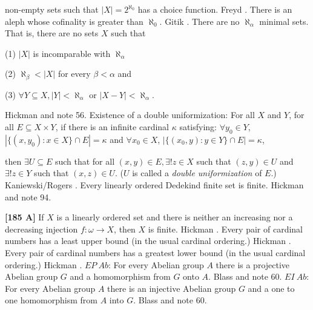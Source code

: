 non-empty sets such that $|X|=2^{\aleph_0}$ has a choice function.
\ac{Freyd} \cite{1980}.
\medskip
{} There is an aleph whose cofinality is greater
than $\aleph_{0}$.  \ac{Gitik} \cite{1980}.
\medskip
{}  There are no $\aleph_{\alpha}$
minimal  sets.  That is, there are no sets $X$ such that
\item\item{}{(1)} $|X|$ is incomparable with $\aleph_{\alpha}$
\item\item{}{(2)} $\aleph_{\beta}<|X|$ for every $\beta < \alpha $ and
\item\item{}{(3)} $\forall Y\subseteq X, |Y|<\aleph_{\alpha}$ or $|X-Y|
<\aleph_{\alpha}$.
\item{} \ac{Hickman} \cite{1980b} and note 56.
\medskip
{}  Existence of a double uniformization: For all
$X$ and $Y$, for all $E\subseteq X\times Y$, if there is an infinite
cardinal $\kappa$ satisfying:
 $\forall y_0\in Y$, $|\{(x,y_0): x\in X\}\cap E| =\kappa$
and
 $\forall x_0\in X$, $|\{(x_0,y): y\in Y\}\cap E| = \kappa$,
\item{} then $\exists U\subseteq E$ such that for all $(x,y)\in E,
\exists !z\in X$ such that $(z,y)\in U$ and $\exists !z\in Y$ such that
$(x,z)\in U$. ($U$ is called a {\it double uniformization} of $E$.)
\ac{Kaniewski/Rogers} \cite{1980}.  
\medskip
{}  Every linearly ordered Dedekind finite set is
finite.  \ac{Hickman} \cite{1979a} and note 94.
\smallskip
\item{}{\bf [185 A]}  If $X$ is a linearly ordered set and there is
neither an increasing nor a decreasing injection $f:\omega\rightarrow X$,
then $X$ is finite.  \ac{Hickman} \cite{1979a}.
\medskip
{}  Every pair of cardinal numbers has a least upper
bound (in the usual cardinal ordering.)  \ac{Hickman} \cite{1979b}.
\medskip
{}  Every pair of cardinal numbers has a greatest
lower bound (in the usual cardinal ordering.)  \ac{Hickman} \cite{1979b}.
\medskip
{} $EP\ Ab$: For every Abelian group $A$ there is a
projective Abelian group $G$ and a homomorphism from $G$ onto $A$.
\ac{Blass}  \cite{1979}  and note 60.
\medskip
{} $EI\ Ab$: For every Abelian group $A$ there is an
injective Abelian group $G$ and a one to one homomorphism from $A$ into $G$.
\ac{Blass} \cite{1979} and note 60.
